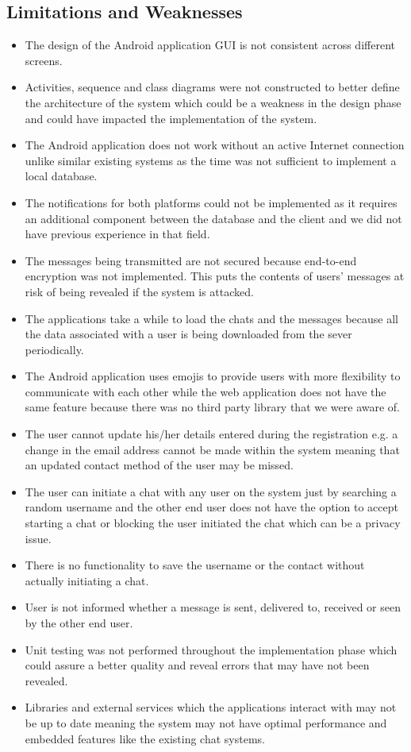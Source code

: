 \documentclass{article}
\begin{document}
\subsection{Limitations and Weaknesses}
\begin{itemize}
\item The design of the Android application GUI is not consistent across different screens.
\item Activities, sequence and class diagrams were not constructed to better define the architecture of the system which could be a weakness in the design phase and could have impacted the implementation of the system. 
\item The Android application does not work without an active Internet connection unlike similar existing systems as the time was not sufficient to implement a local database.
\item The notifications for both platforms could not be implemented as it requires an additional component between the database and the client and we did not have previous experience in that field. 
\item The messages being transmitted are not secured because end-to-end encryption was not implemented. This puts the contents of users' messages at risk of being revealed if the system is attacked. 
\item The applications take a while to load the chats and the messages because all the data associated with a user is being downloaded from the sever periodically. 
\item The Android application uses emojis to provide users with more flexibility to communicate with each other while the web application does not have the same feature because there was no third party library that we were aware of. 
\item The user cannot update his/her details entered during the registration e.g. a change in the email address cannot be made within the system meaning that an updated contact method of the user may be missed. 
\item The user can initiate a chat with any user on the system just by searching a random username and the other end user does not have the option to accept starting a chat or blocking the user initiated the chat which can be a privacy issue. 
\item There is no functionality to save the username or the contact without actually initiating a chat. 
\item User is not informed whether a message is sent, delivered to, received or seen by the other end user. 
\item Unit testing was not performed throughout the implementation phase which could assure a better quality and reveal errors that may have not been revealed. 
\item Libraries and external services which the applications interact with may not be up to date meaning the system may not have optimal performance and embedded features like the existing chat systems.
\end{itemize}
\end{document}
